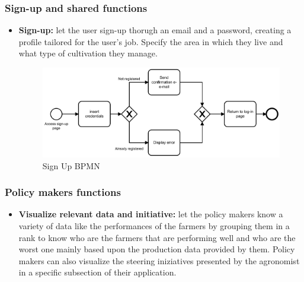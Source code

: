 \documentclass[table, 12pt]{article}
\begin{document}
\subsubsection{Sign-up and shared functions}
\begin{itemize}
    \item \textbf{Sign-up:} let the user sign-up thorugh an email and a password, creating a profile tailored for the user's job. Specify the area in which they live and what type of cultivation they manage.
    \begin{center}
        \begin{figure}[!h]
            \includegraphics[width=\textwidth]{assets/BPMN/SignUpBpmn}
            \caption{Sign Up BPMN}
            \label{fig: singup}
        \end{figure}
    \end{center}
\end{itemize}
\subsubsection{Policy makers functions}
\begin{itemize}                                 
    \item \textbf{Visualize relevant data and initiative: }let the policy makers know a variety of data like the performances of the farmers by grouping them in a rank to know who are the farmers that are performing well and who are the worst one mainly based upon the production data provided by them.
    Policy makers can also visualize the steering iniziatives presented by the agronomist in a specific subsection of their application.
\end{itemize}
\end{document}
